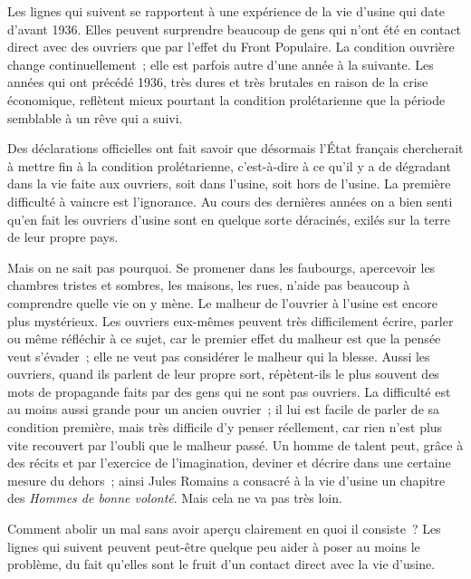 \documentclass[french,twoside]{book} %
\begin{document}
\noindent \par
Les lignes qui suivent se rapportent à une expérience de la vie d'usine qui date d'avant 1936. Elles peuvent surprendre beaucoup de gens qui n'ont été en contact direct avec des ouvriers que par l'effet du Front Populaire. La condition ouvrière change continuellement ; elle est parfois autre d'une année à la suivante. Les années qui ont précédé 1936, très dures et très brutales en raison de la crise économique, reflètent mieux pourtant la condition prolétarienne que la période semblable à un rêve qui a suivi.\par
Des déclarations officielles ont fait savoir que désormais l'État français chercherait à mettre fin à la condition prolétarienne, c'est-à-dire à ce qu'il y a de dégradant dans la vie faite aux ouvriers, soit dans l'usine, soit hors de l'usine. La première difficulté à vaincre est l'ignorance. Au cours des dernières années on a bien senti qu'en fait les ouvriers d'usine sont en quelque sorte déracinés, exilés sur la terre de leur propre pays.\par
Mais on ne sait pas pourquoi. Se promener dans les faubourgs, apercevoir les chambres tristes et sombres, les maisons, les rues, n'aide pas beaucoup à comprendre quelle vie on y mène. Le malheur de l'ouvrier à l'usine est encore plus mystérieux. Les ouvriers eux-mêmes peuvent très difficilement écrire, parler ou même réfléchir à ce sujet, car le premier effet du malheur est que la pensée veut s'évader ; elle ne veut pas considérer le malheur qui la blesse. Aussi les ouvriers, quand ils parlent de leur propre sort, répètent-ils le plus souvent des mots de propagande faits par des gens qui ne sont pas ouvriers. La difficulté est au moins aussi grande pour un ancien ouvrier ; il lui est facile de parler de sa condition première, mais très difficile d'y penser réellement, car rien n'est plus vite recouvert par l'oubli que le malheur passé. Un homme de talent peut, grâce à des récits et par l'exercice de l'imagination, deviner et décrire dans une certaine mesure du dehors ; ainsi Jules Romains a consacré à la vie d'usine un chapitre des {\itshape Hommes de bonne volonté}. Mais cela ne va pas très loin.\par
Comment abolir un mal sans avoir aperçu clairement en quoi il consiste ? Les lignes qui suivent peuvent peut-être quelque peu aider à poser au moins le problème, du fait qu'elles sont le fruit d'un contact direct avec la vie d'usine.\par
\end{document}
